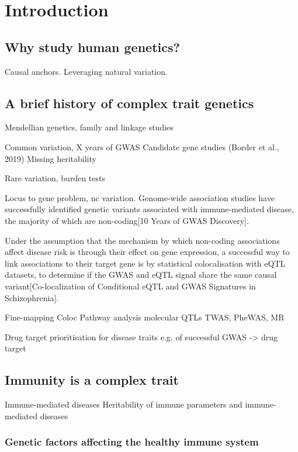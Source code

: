 %
%

\chapter{Introduction}

\section{Why study human genetics?}
Causal anchors.
Leveraging natural variation.

\section{A brief history of complex trait genetics}

Mendellian genetics, family and linkage studies

Common variation, X years of GWAS
Candidate gene studies (Border et al., 2019)
Missing heritability

Rare variation, burden tests

Locus to gene problem, nc variation.
Genome-wide association studies have successfully identified genetic variants associated with immune-mediated disease, the majority of which are non-coding[10 Years of GWAS Discovery].

Under the assumption that the mechanism by which non-coding associations affect disease risk is through their effect on gene expression, a successful way to link associations to their target gene is by statistical colocalisation with eQTL datasets, to determine if the GWAS and eQTL signal share the same causal variant[Co-localization of Conditional eQTL and GWAS Signatures in Schizophrenia].

    Fine-mapping
    Coloc
    Pathway analysis
    molecular \glspl{QTL}
    TWAS, PheWAS\autocite{verma2017CurrentScopeChallenges}, MR

Drug target prioritisation for disease traits
e.g. of successful GWAS -> drug target

\section{Immunity is a complex trait}
Immune-mediated diseases
Heritability of immune parameters and immune-mediated diseases

\subsection{Genetic factors affecting the healthy immune system}

